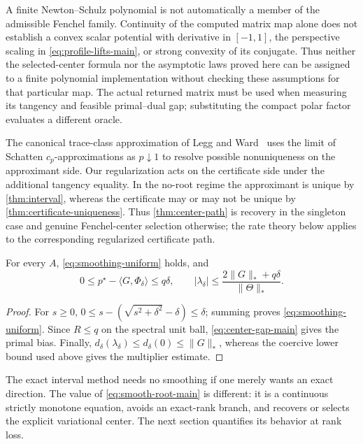 \begin{remark}
\label{rem:finite-ns-boundary-main}
A finite Newton--Schulz polynomial is not automatically a member of the
admissible Fenchel family.  Continuity of the computed matrix map alone
does not establish a convex scalar potential with derivative in \([-1,1]\),
the perspective scaling in \eqref{eq:profile-lifts-main}, or strong
convexity of its conjugate.  Thus neither the selected-center formula nor
the asymptotic laws proved here can be assigned to a finite polynomial
implementation without checking these assumptions for that particular map.
The actual returned matrix must be used when measuring its tangency and
feasible primal--dual gap; substituting the compact polar factor evaluates
a different oracle.
\end{remark}

\begin{remark}
\label{rem:legg-ward}
The canonical trace-class approximation of Legg and Ward~\cite{legg1985canonical} uses the
limit of Schatten \(c_p\)-approximations as \(p\downarrow1\) to resolve
possible nonuniqueness on the approximant side.  Our regularization acts on
the certificate side under the additional tangency equality.  In the no-root
regime the approximant is unique by \cref{thm:interval}, whereas the
certificate may or may not be unique by
\cref{thm:certificate-uniqueness}.  Thus \cref{thm:center-path} is recovery in
the singleton case and genuine Fenchel-center selection otherwise; the rate
theory below applies to the corresponding regularized certificate path.
\end{remark}

\begin{corollary}
\label{cor:global-bounds}
For every \(A\), \eqref{eq:smoothing-uniform} holds, and
\begin{equation}
 0\le p^\star-\langle G,\Phi_\delta\rangle\le q\delta,
 \qquad
 |\lambda_\delta|
 \le\frac{2\|G\|_*+q\delta}{\|\Theta\|_*}.
 \label{eq:smooth-lambda-bound}
\end{equation}
\end{corollary}

\begin{proof}
For \(s\ge0\),
\(0\le s-(\sqrt{s^2+\delta^2}-\delta)\le\delta\); summing proves
\eqref{eq:smoothing-uniform}.  Since \(R\le q\) on the spectral unit ball,
\eqref{eq:center-gap-main} gives the primal bias.  Finally,
\(d_\delta(\lambda_\delta)\le d_\delta(0)\le\|G\|_*\), whereas the coercive
lower bound used above gives the multiplier estimate.
\end{proof}

The exact interval method needs no smoothing if one merely wants an exact
direction.  The value of \eqref{eq:smooth-root-main} is different: it is a
continuous strictly monotone equation, avoids an exact-rank branch, and
recovers or selects the explicit variational center.  The next section quantifies its
behavior at rank loss.
